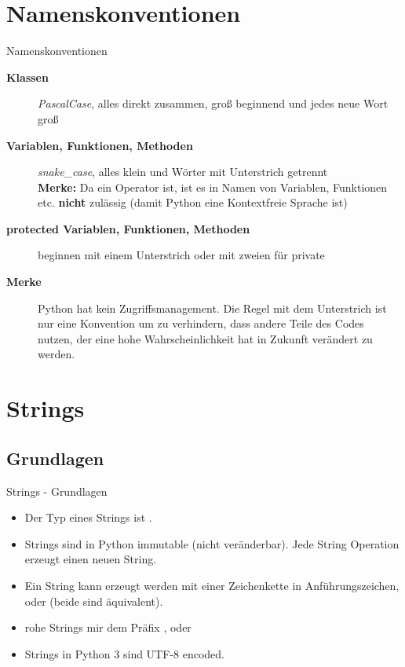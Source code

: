 \section{Namenskonventionen}
\begin{frame}[fragile]{Namenskonventionen}
	\begin{description}
	    \item[\textbf{Klassen}] \textit{PascalCase}, alles direkt zusammen, gro\ss{} beginnend und jedes neue Wort gro\ss{}
	    \item[\textbf{Variablen, Funktionen, Methoden}] \textit{snake\_case}, alles klein und Wörter mit Unterstrich getrennt \\
	    \textbf{Merke:} Da \codeline{-} ein Operator ist, ist es in Namen von Variablen, Funktionen etc. \textbf{nicht} zulässig (damit Python eine Kontextfreie Sprache ist)
	    \item[\textbf{protected Variablen, Funktionen, Methoden}] beginnen mit einem Unterstrich \codeline{\_} oder mit zweien \codeline{\_\_} für private
	    \item[\textbf{Merke}] Python hat kein Zugriffsmanagement. Die Regel mit dem Unterstrich ist nur eine Konvention um zu verhindern, dass andere Teile des Codes nutzen, der eine hohe Wahrscheinlichkeit hat in Zukunft verändert zu werden.
	\end{description}
\end{frame}


\section{Strings}
\subsection{Grundlagen}
\begin{frame}[fragile]{Strings - Grundlagen}
	\begin{itemize}
	    \item Der Typ eines Strings ist .
	    \item Strings sind in Python immutable (nicht veränderbar). Jede String Operation erzeugt einen neuen String.
	    \item Ein String kann erzeugt werden mit einer Zeichenkette in Anführungszeichen, \codeline{\'\'} oder \codeline{\"\"} (beide sind äquivalent).
	    \item rohe Strings mir dem Präfix ,  oder 
	    \item Strings in Python 3 sind UTF-8 encoded.
	\end{itemize}
\end{frame}


